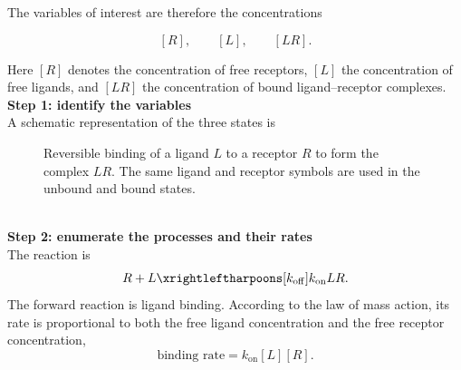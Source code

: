 The variables of interest are therefore the concentrations

\[
    [R], \qquad [L], \qquad [LR].
\]

Here $[R]$ denotes the concentration of free receptors, $[L]$ the concentration of free ligands, and $[LR]$ the concentration of bound ligand--receptor complexes.
% 
% 
\medskip
\\
\textbf{Step 1: identify the variables}
\\
A schematic representation of the three states is
\begin{figure}[h]
    \centering
    \caption{Reversible binding of a ligand $L$ to a receptor $R$ to form the complex $LR$.
    The same ligand and receptor symbols are used in the unbound and bound states.}
\end{figure}
% 
% 
\medskip
\\
\textbf{Step 2: enumerate the processes and their rates}
\\
The reaction is
\[
    R + L \xrightleftharpoons[k_{\mathrm{off}}]{k_{\mathrm{on}}} LR.
\]
The forward reaction is ligand binding.
According to the law of mass action, its rate is proportional to both the free ligand concentration and the free receptor concentration,
\[
    \text{binding rate} = k_{\mathrm{on}}[L][R].
\]

